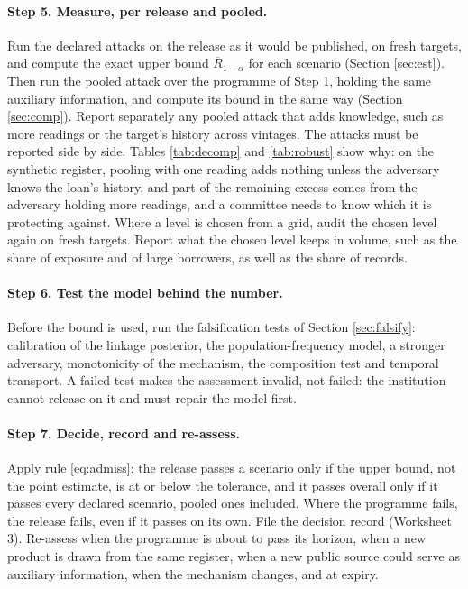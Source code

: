 \paragraph{Step 5. Measure, per release and pooled.}
Run the declared attacks on the release as it would be published, on fresh
targets, and compute the exact upper bound $\overline{R}_{1-\alpha}$ for each
scenario (Section \ref{sec:est}). Then run the pooled attack over the programme
of Step 1, holding the same auxiliary information, and compute its bound in the
same way (Section \ref{sec:comp}). Report separately any pooled attack that adds
knowledge, such as more readings or the target's history across vintages. The
attacks must be reported side by side. Tables \ref{tab:decomp} and
\ref{tab:robust} show why: on the synthetic register, pooling with one reading
adds nothing unless the adversary knows the loan's history, and part of the
remaining excess comes from the adversary holding more readings, and a committee
needs to know which it is protecting against. Where a level is chosen from a
grid, audit the chosen level again on fresh targets. Report what the chosen
level keeps in volume, such as the share of exposure and of large borrowers, as
well as the share of records.

\paragraph{Step 6. Test the model behind the number.}
Before the bound is used, run the falsification tests of Section
\ref{sec:falsify}: calibration of the linkage posterior, the population-frequency
model, a stronger adversary, monotonicity of the mechanism, the composition test
and temporal transport. A failed test makes the assessment invalid, not failed:
the institution cannot release on it and must repair the model first.

\paragraph{Step 7. Decide, record and re-assess.}
Apply rule \eqref{eq:admiss}: the release passes a scenario only if the upper
bound, not the point estimate, is at or below the tolerance, and it passes
overall only if it passes every declared scenario, pooled ones included. Where
the programme fails, the release fails, even if it passes on its own. File the
decision record (Worksheet 3). Re-assess when the programme is about to pass its
horizon, when a new product is drawn from the same register, when a new public
source could serve as auxiliary information, when the mechanism changes, and at
expiry.

